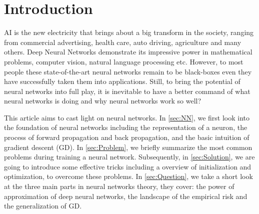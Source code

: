 \newpage

\section{Introduction}

AI is the new electricity that brings about a big transform in
the society, ranging from commercial advertising, health care, 
auto driving, agriculture and many others. Deep Neural Networks 
demonstrate its impressive power in mathematical problems, computer 
vision, natural language processing etc. However, to most people 
these state-of-the-art neural networks remain to be black-boxes even 
they have successfully taken them into applications. Still, to bring
the potential of neural networks into full play, it is inevitable to
have a better command of what neural networks is doing and why neural
networks work so well?


\par This article aims to cast light on neural networks. In \autoref{sec:NN},
we first look into the foundation of neural networks including the
representation of a neuron, the process of forward propagation and 
back propagation, and the basic intuition of gradient descent (GD).
In \autoref{sec:Problem}, we briefly summarize the most common 
problems during training a neural network. Subsequently, in \autoref{sec:Solution},
we are going to introduce some effective tricks including a overview
of initialization and optimization, to overcome these problems. In
\autoref{sec:Question}, we take a short look at the three main parts in
neural networks theory, they cover: the power of approximation of 
deep neural networks, the landscape of the empirical risk and the 
generalization of GD.


